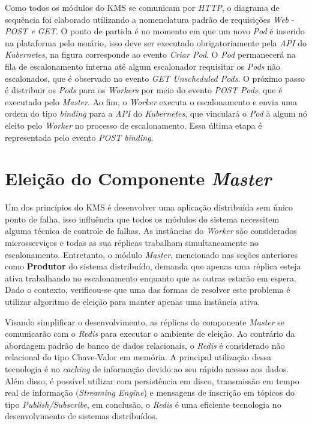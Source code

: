 Como todos os módulos do \ac{KMS} se comunicam por \textit{HTTP}, o diagrama de sequência foi elaborado utilizando a nomenclatura padrão de requisições \textit{Web} - \textit{POST e GET}. O ponto de partida é no momento em que um novo \textit{Pod} é inserido na plataforma pelo usuário, isso deve ser executado obrigatoriamente pela \textit{API} do \textit{Kubernetes}, na figura corresponde ao evento \textit{Criar Pod}. O \textit{Pod} permanecerá na fila de escalonamento interna até algum escalonador requisitar os \textit{Pods} não escalonados, que é observado no evento \textit{GET Unscheduled Pods}. O próximo passo é distribuir os \textit{Pods} para os \textit{Workers} por meio do evento \textit{POST Pods}, que é executado pelo \textit{Master}. Ao fim, o \textit{Worker} executa o escalonamento e envia uma ordem do tipo \textit{binding} para a \textit{API} do \textit{Kubernetes}, que vinculará o \textit{Pod} à algum nó eleito pelo \textit{Worker} no processo de escalonamento. Essa última etapa é representada pelo evento \textit{POST binding}.


\section{Eleição do Componente \textit{Master} \label{eleicao-master}}

Um dos princípios do \ac{KMS} é desenvolver uma aplicação distribuída sem único ponto de falha, isso influência que todos os módulos do sistema necessitem alguma técnica de controle de falhas. As instâncias do \textit{Worker} são considerados microsserviços e todas as sua réplicas trabalham simultaneamente no escalonamento. Entretanto, o módulo \textit{Master}, mencionado nas seções anteriores como \textbf{Produtor} do sistema distribuído, demanda que apenas uma réplica esteja ativa trabalhando no escalonamento enquanto que as outras estarão em espera. Dado o contexto, verificou-se que uma das formas de resolver este problema é utilizar algoritmo de eleição para manter apenas uma instância ativa.

Visando simplificar o desenvolvimento, as réplicas do componente \textit{Master} se comunicarão com o \textit{Redis} para executar o ambiente de eleição. Ao contrário da abordagem padrão de banco de dados relacionais, o \textit{Redis} é considerado não relacional do tipo Chave-Valor em memória. A principal utilização dessa tecnologia é no \textit{caching} de informação devido ao seu rápido acesso aos dados. Além disso, é possível utilizar com persistência em disco, transmissão em tempo real de informação (\textit{Streaming Engine}) e mensagens de inscrição em tópicos do tipo \textit{Publish/Subscribe}, em conclusão, o \textit{Redis} é uma eficiente tecnologia no desenvolvimento de sistemas distribuídos.

